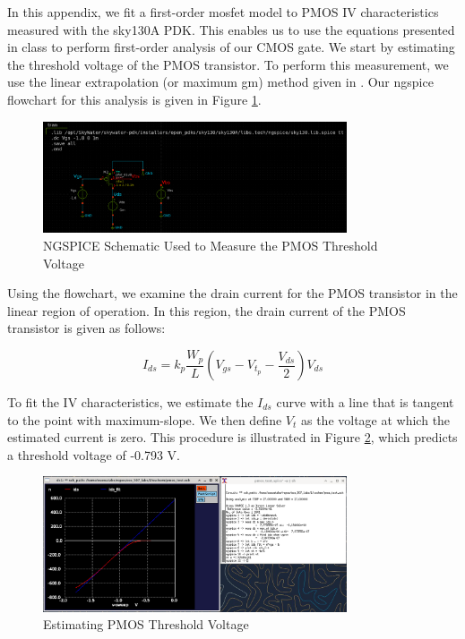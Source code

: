\documentclass[fleqn]{article}
\begin{document}
	In this appendix, we fit a first-order mosfet model to PMOS IV characteristics measured with the sky130A PDK. This enables us to use the equations presented in class to perform first-order analysis of our CMOS gate. We start by estimating the threshold voltage of the PMOS transistor. To perform this measurement, we use the linear extrapolation (or maximum gm) method given in \cite{cmos_vlsi_design}. Our ngspice flowchart for this analysis is given in Figure \ref{fig::pmos_vt_meas_schem}.
	
	\begin{figure}[H]
		\centerline{\includegraphics[width=0.8\textwidth]{pmos_vt_meas_schem.png}}
		\caption{NGSPICE Schematic Used to Measure the PMOS Threshold Voltage}
		\label{fig::pmos_vt_meas_schem}
	\end{figure}
	
	\noindent Using the flowchart, we examine the drain current for the PMOS transistor in the linear region of operation. In this region, the drain current of the PMOS transistor is given as follows:
	
	\begin{equation}
		I_{ds} = k_p\frac{W_p}{L}\left(V_{gs} - V_{t_p} - \frac{V_{ds}}{2}\right)V_{ds}
	\end{equation}
	
	\noindent To fit the IV characteristics, we estimate the $I_{ds}$ curve with a line that is tangent to the point with maximum-slope. We then define $V_t$ as the voltage at which the estimated current is zero. This procedure is illustrated in Figure \ref{fig::pmos_vt_meas}, which predicts a threshold voltage of -0.793 V.
	
	\begin{figure}[H]
		\centerline{\includegraphics[width=0.8\textwidth]{pmos_vt_meas.png}}
		\caption{Estimating PMOS Threshold Voltage}
		\label{fig::pmos_vt_meas}
	\end{figure}
	
\end{document}
